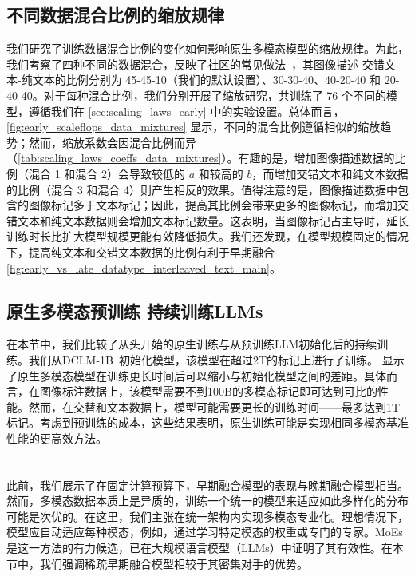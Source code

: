 \subsection{不同数据混合比例的缩放规律}  
\label{sec:scaling_data_mix}  
我们研究了训练数据混合比例的变化如何影响原生多模态模型的缩放规律。为此，我们考察了四种不同的数据混合，反映了社区的常见做法~\citep{laurenccon2024obelics,mckinzie2025mm1,zhang2024mm1_5,lin2024vila}，其图像描述-交错文本-纯文本的比例分别为 \colorbox{blue!10}{45-45-10}（我们的默认设置）、\colorbox{red!10}{30-30-40}、\colorbox{green!10}{40-20-40} 和 \colorbox{orange!10}{20-40-40}。对于每种混合比例，我们分别开展了缩放研究，共训练了 76 个不同的模型，遵循我们在 \cref{sec:scaling_laws_early} 中的实验设置。总体而言，\cref{fig:early_scaleflops_data_mixtures} 显示，不同的混合比例遵循相似的缩放趋势；然而，缩放系数会因混合比例而异（\cref{tab:scaling_laws_coeffs_data_mixtures}）。有趣的是，增加图像描述数据的比例（混合 1 和混合 2）会导致较低的 $a$ 和较高的 $b$，而增加交错文本和纯文本数据的比例（混合 3 和混合 4）则产生相反的效果。值得注意的是，图像描述数据中包含的图像标记多于文本标记；因此，提高其比例会带来更多的图像标记，而增加交错文本和纯文本数据则会增加文本标记数量。这表明，当图像标记占主导时，延长训练时长比扩大模型规模更能有效降低损失。我们还发现，在模型规模固定的情况下，提高纯文本和交错文本数据的比例有利于早期融合 \cref{fig:early_vs_late_datatype_interleaved_text_main}。
\subsection{原生多模态预训练 \textbf{\vs} 持续训练LLMs}
\label{sec:native_vs_continual}
在本节中，我们比较了从头开始的原生训练与从预训练LLM初始化后的持续训练。我们从DCLM-1B~\citep{fang2023data}初始化模型，该模型在超过2T的标记上进行了训练。 显示了原生多模态模型在训练更长时间后可以缩小与初始化模型之间的差距。具体而言，在图像标注数据上，该模型需要不到100B的多模态标记即可达到可比的性能。然而，在交替和文本数据上，模型可能需要更长的训练时间——最多达到1T标记。考虑到预训练的成本，这些结果表明，原生训练可能是实现相同多模态基准性能的更高效方法。


\section{}

此前，我们展示了在固定计算预算下，早期融合模型的表现与晚期融合模型相当。然而，多模态数据本质上是异质的，训练一个统一的模型来适应如此多样化的分布可能是次优的。在这里，我们主张在统一架构内实现多模态专业化。理想情况下，模型应自动适应每种模态，例如，通过学习特定模态的权重或专门的专家。MoEs 是这一方法的有力候选，已在大规模语言模型（LLMs）中证明了其有效性。在本节中，我们强调稀疏早期融合模型相较于其密集对手的优势。

